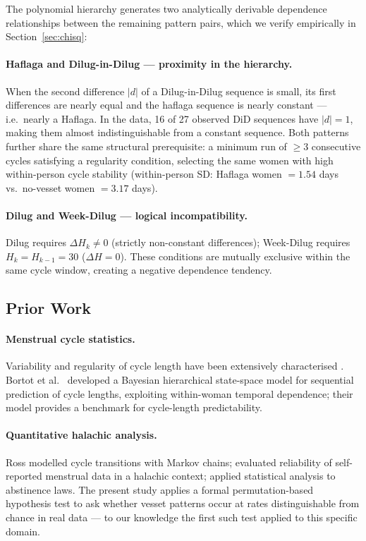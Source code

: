 \documentclass[12pt]{article}
\begin{document}
The polynomial hierarchy generates two analytically derivable dependence
relationships between the remaining pattern pairs, which we verify empirically in
Section~\ref{sec:chisq}:

\paragraph{Haflaga and Dilug-in-Dilug --- proximity in the hierarchy.}
When the second difference $|d|$ of a Dilug-in-Dilug sequence is small, its first
differences are nearly equal and the haflaga sequence is nearly constant --- i.e.\
nearly a Haflaga. In the data, 16 of 27 observed DiD sequences have $|d| = 1$,
making them almost indistinguishable from a constant sequence. Both patterns further
share the same structural prerequisite: a minimum run of $\geq 3$ consecutive cycles
satisfying a regularity condition, selecting the same women with high within-person
cycle stability (within-person SD: Haflaga women $= 1.54$ days vs.\ no-vesset women
$= 3.17$ days).

\paragraph{Dilug and Week-Dilug --- logical incompatibility.}
Dilug requires $\Delta H_k \neq 0$ (strictly non-constant differences); Week-Dilug
requires $H_k = H_{k-1} = 30$ ($\Delta H = 0$). These conditions are mutually
exclusive within the same cycle window, creating a negative dependence tendency.

\subsection{Prior Work}

\paragraph{Menstrual cycle statistics.}
Variability and regularity of cycle length have been extensively characterised
\cite{munster1992,creinin2004,dasharathy2012,symul2019}. Bortot et al.\
\cite{bortot2010} developed a Bayesian hierarchical state-space model for sequential
prediction of cycle lengths, exploiting within-woman temporal dependence; their model
provides a benchmark for cycle-length predictability.

\paragraph{Quantitative halachic analysis.}
Ross \cite{anon2022markov} modelled cycle transitions with Markov chains;
\cite{anon2019reliability} evaluated reliability of self-reported menstrual data in
a halachic context; \cite{anon2021statistical} applied statistical analysis to
abstinence laws. The present study applies a formal permutation-based hypothesis test to ask whether
vesset patterns occur at rates distinguishable from chance in real data --- to our
knowledge the first such test applied to this specific domain.
\end{document}
